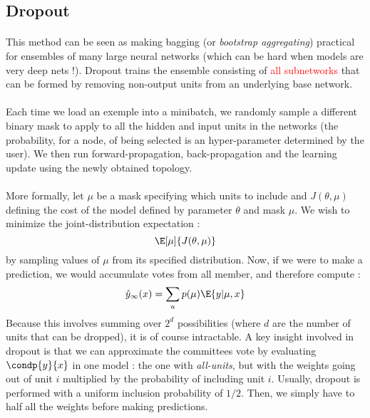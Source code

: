 \documentclass[a4paper]{article}
\begin{document}
{		\subsection{Dropout}
		{
			\paragraph{} This method can be seen as making bagging (or \emph{bootstrap aggregating}) practical for ensembles of many large neural networks (which can be hard when models are very deep nets !). Dropout trains the ensemble consisting of \textcolor{red}{all subnetworks} that can be formed by removing non-output units from an underlying base network. 
			
			\paragraph{} Each time we load an exemple into a minibatch, we randomly sample a different binary mask to apply to all the hidden and input units in the networks (the probability, for a node, of being selected is an hyper-parameter determined by the user). We then run forward-propagation, back-propagation and the learning update using the newly obtained topology. 
			
			\paragraph{} More formally, let $\mu$ be a mask specifying which units to include and $J(\theta,\mu)$ defining the cost of the model defined by parameter $\theta$ and mask $\mu$. We wish to minimize the joint-distribution expectation : 
			\begin{equation}
				\E[\mu]{J(\theta,\mu)}
			\end{equation}
			by sampling values of $\mu$ from its specified distribution. 
			 Now, if we were to make a prediction, we would accumulate votes from all member, and therefore compute : 
			 \begin{equation}
			 	\hat{y}_\infty(x) = \sum_u p(\mu) \E{y\vert \mu,x}
			 \end{equation}
			 Because this involves summing over $2^d$ possibilities (where $d$ are the number of units that can be dropped), it is of course intractable. A key insight involved in dropout is that we can approximate the committees vote by evaluating $\condp{y}{x}$ in one model : the one with \emph{all-units}, but with the weights going out of unit $i$ multiplied by the probability of including unit $i$. Usually, dropout is performed with a uniform inclusion probability of $1/2$. Then, we simply have to half all the weights before making predictions. 
			 
}}
\end{document}
